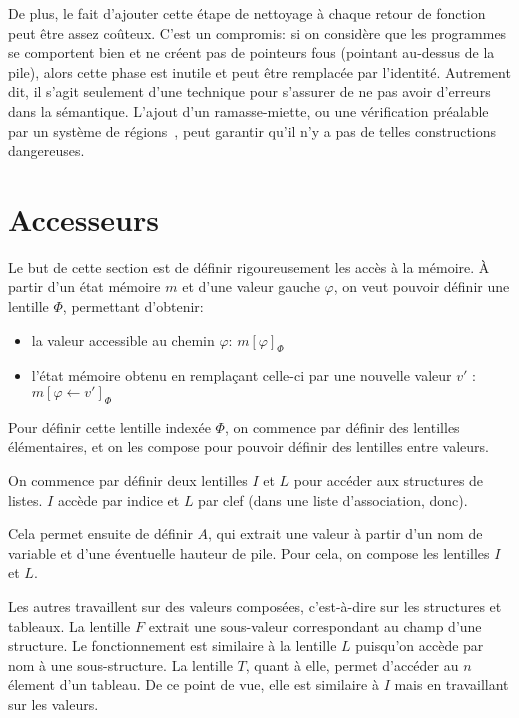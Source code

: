 De plus, le fait d'ajouter cette étape de nettoyage à chaque retour de fonction
peut être assez coûteux. C'est un compromis: si on considère que les programmes
se comportent bien et ne créent pas de pointeurs fous (pointant au-dessus de la
pile), alors cette phase est inutile et peut être remplacée par l'identité.
Autrement dit, il s'agit seulement d'une technique pour s'assurer de ne pas
avoir d'erreurs dans la sémantique. L'ajout d'un ramasse-miette, ou une
vérification préalable par un système de régions~\cite{jfp92}, peut garantir
qu'il n'y a pas de telles constructions dangereuses.

\section{Accesseurs}
\label{sec:mem-access}

Le but de cette section est de définir rigoureusement les accès à la mémoire. À
partir d'un état mémoire $m$ et d'une valeur gauche $φ$, on veut pouvoir définir
une lentille $Φ$, permettant d'obtenir:

\begin{itemize}
    \item la valeur accessible au chemin $φ$: $m[φ]_Φ$
    \item l'état mémoire obtenu en remplaçant celle-ci par une nouvelle valeur $v'$ :
            $m[φ ← v']_Φ$
\end{itemize}

Pour définir cette lentille indexée $Φ$, on commence par définir des lentilles
élémentaires, et on les compose pour pouvoir définir des lentilles entre
valeurs.

On commence par définir deux lentilles $I$ et $L$ pour accéder aux structures de
listes. $I$ accède par indice et $L$ par clef (dans une liste d'association,
donc).

Cela permet ensuite de définir $A$, qui extrait une valeur à partir d'un nom de
variable et d'une éventuelle hauteur de pile. Pour cela, on compose les
lentilles $I$ et $L$.

Les autres travaillent sur des valeurs composées, c'est-à-dire sur les
structures et tableaux. La lentille $F$ extrait une sous-valeur
correspondant au champ d'une structure. Le fonctionnement est similaire à la
lentille $L$ puisqu'on accède par nom à une sous-structure.
La lentille $T$, quant à elle, permet d'accéder au $n$\ieme élement d'un
tableau. De ce point de vue, elle est similaire à $I$ mais en travaillant sur
les valeurs.

